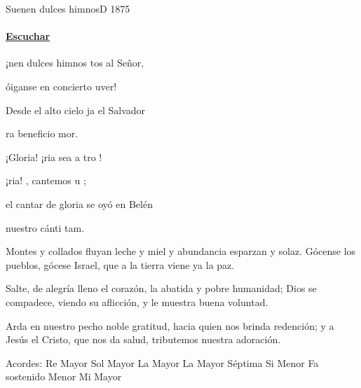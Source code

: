 \documentclass[12pt, spanish]{book}
\newcommand{\NotCCLIed}{\relax}
\begin{document}
    \begin{song}{Suenen dulces himnos}{D}
    {1875} %
    {}
    {} %
    {} %
        \ifChordBk
            \paragraph{\mbox{}\hfill\protect\href{https://open.spotify.com/intl-es/track/3Hha3JpXn0NwNaoVRl1Guf}{Escuchar}\mbox{}\hfill}
        \fi

        \begin{SBOpGroup}
            ¡nen dulces himnos tos al Señor,

             óiganse en concierto uver!

            Desde el alto cielo ja el Salvador

            ra beneficio  mor.
        \end{SBOpGroup}

        \begin{SBChorus}
            ¡Gloria! ¡ria sea a tro !

            ¡ria! , cantemos  u ;

             el cantar de gloria  se oyó en Belén

             nuestro cánti tam.
        \end{SBChorus}

        \begin{SBOpGroup}
            Montes y collados fluyan leche y miel
            y abundancia esparzan y solaz.
            Gócense los pueblos, gócese Israel,
            que a la tierra viene ya la paz.
        \end{SBOpGroup}
        \vskip 20pt
        \begin{SBOpGroup}
            Salte, de alegría lleno el corazón,
            la abatida y pobre humanidad;
            Dios se compadece, viendo su aflicción,
            y le muestra buena voluntad.
        \end{SBOpGroup}
        \vskip 20pt
        \begin{SBOpGroup}
            Arda en nuestro pecho noble gratitud,
            hacia quien nos brinda redención;
            y a Jesús el Cristo, que nos da salud,
            tributemos nuestra adoración.
        \end{SBOpGroup}

        \ifChordBk
        \begin{SBOpGroup}
            Acordes:\break
            \upchord{\D}\qquad Re Mayor \hfill
            \upchord{\G}\qquad Sol Mayor \hfill\null\break
            \upchord{\A}\qquad La Mayor \hfill
            \upchord{\Aseven}\qquad La Mayor S\'eptima \hfill
            \upchord{\Bm}\qquad Si Menor \hfill\null\break
            \upchord{\Fsm}\qquad Fa sostenido Menor \hfill
            \upchord{\E}\qquad Mi Mayor \hfill\null\break
        \end{SBOpGroup}
        \fi
    \end{song}
\end{document}
